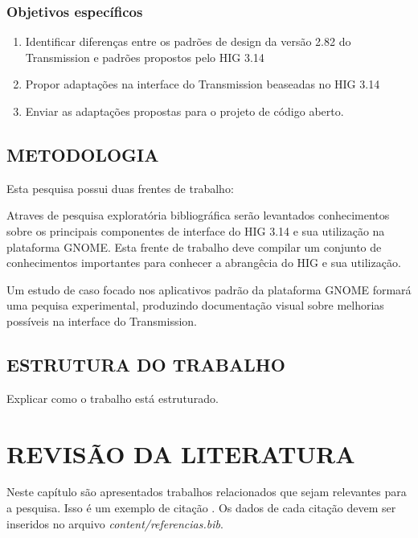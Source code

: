 \documentclass[
	12pt,				%
	openright,			%
	oneside,			%
	a4paper,			%
	chapter=TITLE,		%
	section=TITLE,		%
	brazil				%
	]{abntex2}
\begin{document}
\subsection{Objetivos específicos}

\begin{enumerate}
  \item Identificar diferenças entre os padrões de design da versão 2.82 do
  Transmission e padrões propostos pelo HIG 3.14
  \item Propor adaptações na interface do Transmission beaseadas no HIG 3.14
  \item Enviar as adaptações propostas para o projeto de código aberto. 
\end{enumerate}

\section{METODOLOGIA}

Esta pesquisa possui duas frentes de trabalho:

Atraves de pesquisa exploratória bibliográfica serão levantados conhecimentos
sobre os principais componentes de interface do HIG 3.14 e sua utilização na
plataforma GNOME. Esta frente de trabalho deve compilar um conjunto de 
conhecimentos importantes para conhecer a abrangêcia do HIG e sua utilização. 

Um estudo de caso focado nos aplicativos padrão da plataforma GNOME formará uma
pequisa experimental, produzindo documentação visual sobre melhorias possíveis
na interface do Transmission.

\section{ESTRUTURA DO TRABALHO}

Explicar como o trabalho está estruturado.

\chapter{REVISÃO DA LITERATURA}\label{cap-revisao}




Neste capítulo são apresentados trabalhos relacionados que sejam relevantes
para a pesquisa. Isso é um exemplo de citação \cite[p. 10]{van86}. Os dados de
cada citação devem ser inseridos no arquivo \textit{content/referencias.bib}.
\end{document}
